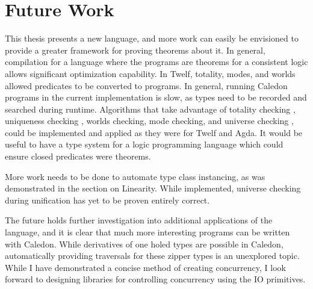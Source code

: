 \section{Future Work}

This thesis presents a new language, and more work can easily be envisioned to provide a greater
framework for proving theorems about it. In general, compilation for a language
where the programs are theorems for a consistent logic allows significant optimization
capability. In Twelf, totality, modes, and worlds allowed predicates to be converted
to programs. In general, running Caledon programs in the current implementation
is slow, as types need to be recorded and searched during runtime. Algorithms
that take advantage of totality checking \citep{altenkirch2010termination}, 
uniqueness checking \citep{anderson2004verifying}, 
worlds checking\citep{anderson2004verifying}, 
mode checking\citep{anderson2004verifying}, 
and universe checking \citep{harper1991type}, 
could be implemented and applied as they were for Twelf and Agda.  It would be useful to have a type system for a logic programming
language which could ensure closed predicates were theorems. 

More work needs to be done to automate type class instancing, as was demonstrated in the section on Linearity.
While implemented, universe checking during unification has yet to be proven entirely
correct.

The future holds further investigation into additional applications of the language, and
it is clear that much more interesting programs can be written with Caledon. While derivatives of one
holed types are possible in Caledon, automatically providing traversals for these
zipper types is an unexplored topic. While I have demonstrated a concise method of
creating concurrency, I look forward to designing libraries for controlling concurrency using the IO primitives.
